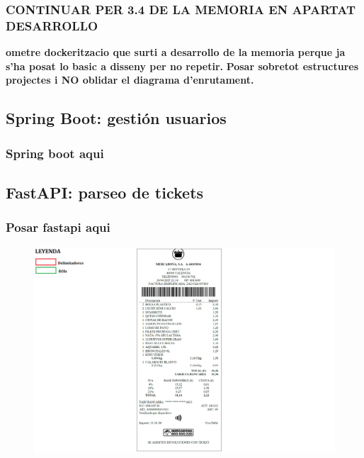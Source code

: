 \documentclass{beamer}
\begin{document}
	
	
	
	\begin{frame}
		\frametitle{CONTINUAR PER 3.4 DE LA MEMORIA EN APARTAT DESARROLLO}
		\textbf{ometre dockeritzacio que surti a desarrollo de la memoria perque ja s'ha posat lo basic a disseny per no repetir.}
		\textbf{Posar sobretot estructures projectes i NO oblidar el diagrama d'enrutament.}
	\end{frame}
	
	
	
	
	\subsection{Spring Boot: gestión usuarios}
	
	
	
	\begin{frame}
		\frametitle{Spring boot aqui}
	\end{frame}
	
	
	
	
	
	
	
	
	
	\subsection{FastAPI: parseo de tickets}
	
	


		\begin{frame}
		\frametitle{Posar fastapi aqui}
		
		
		\end{frame}


		\begin{frame}
			\begin{figure}
				\centering
				\includegraphics[width=1\linewidth]{imgEspecifiques/ticketExtraccioA.png}
				\label{fig:ticketExtraccioA}
			\end{figure}
		\end{frame}
		
\end{document}
